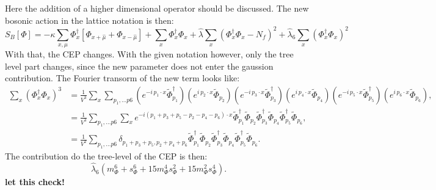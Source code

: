 Here the addition of a higher dimensional operator should be discussed. The new bosonic action in the lattice notation is then:
\begin{equation}\label{eq:bosonicLatticeActionWithLambda_6}
 S_B[\Phi]  = -\kappa \sum\limits_{x,\mu} \Phi_x^{\dagger} \left[\Phi_{x+\hat\mu} + \Phi_{x-\hat\mu} \right] 
              + \sum\limits_x \Phi_x^{\dagger} \Phi_x 
              + \hat{\lambda} \sum\limits_x \left( \Phi_x^{\dagger} \Phi_x - N_f\right)^2 + \hat \lambda_6 \sum\limits_x \left( \Phi_x^{\dagger} \Phi_x \right)^2
\end{equation}
With that, the CEP changes. With the given notation however, only the tree level part changes, since the new parameter does not enter the gaussion contribution.
The Fourier transorm of the new term looks like:
\begin{align}
 \sum\limits_{x} \left( \Phi_x^{\dagger} \Phi_x \right)^3 &= 
                     \frac{1}{V^3}  \sum\limits_{x}  \sum\limits_{p_1,\dots p6}  
                     \left( e^{-i\, p_1 \cdot x}  \tilde\Phi_{p_1}^{\dagger} \right) \left( e^{i\, p_2 \cdot x}  \tilde\Phi_{p_2} \right)
                     \left( e^{-i\, p_3 \cdot x}  \tilde\Phi_{p_3}^{\dagger} \right) \left( e^{i\, p_4 \cdot x}  \tilde\Phi_{p_4} \right)
                     \left( e^{-i\, p_5 \cdot x}  \tilde\Phi_{p_5}^{\dagger} \right) \left( e^{i\, p_6 \cdot x}  \tilde\Phi_{p_6} \right), \nonumber \\
                  &= \frac{1}{V^3}  \sum\limits_{p_1,\dots p6} 
                     \sum\limits_{x}  e^{ -i (p_1 + p_3 + p_5 - p_2 - p_4 - p_6) \cdot x }  
                     \tilde\Phi_{p_1}^{\dagger} \tilde\Phi_{p_2} \tilde\Phi_{p_3}^{\dagger} \tilde\Phi_{p_4} \tilde\Phi_{p_5}^{\dagger} \tilde\Phi_{p_6},
                     \nonumber \\
                  &= \frac{1}{V^2}\sum\limits_{p_1,\dots p6} \delta_{p_1 + p_3 + p_5, p_2 + p_4 + p_6} 
                     \tilde\Phi_{p_1}^{\dagger} \tilde\Phi_{p_2} \tilde\Phi_{p_3}^{\dagger} \tilde\Phi_{p_4} \tilde\Phi_{p_5}^{\dagger} \tilde\Phi_{p_6}
                      \label{eq:FourierTrafoPhiToTheSix}.
\end{align}
The contribution do the tree-level of the CEP is then:
\begin{equation}\label{eq:CEP_tree_level_Contribution_from_lambda_6}
 \hat\lambda_6 \left( m_{\Phi}^6 + s_{\Phi}^6 + 15 m_{\Phi}^4 s_{\Phi}^2 + 15 m_{\Phi}^2 s_{\Phi}^4\right).
\end{equation}
\textbf{let this check!}


